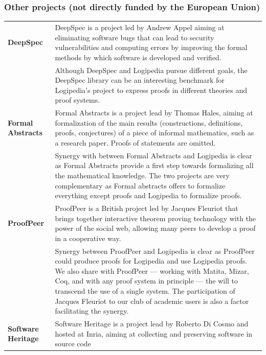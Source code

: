 \subsubsection*{Other projects (not directly funded by the European Union)}

\begin{longtable}{|p{}|p{}|}
\hline
{\bf DeepSpec}
&
DeepSpec is a project led by Andrew Appel aiming at eliminating
software bugs that can lead to security vulnerabilities and computing
errors by improving the formal methods by which software is developed
and verified.
\\
&
\hspace{0.4cm}
Although DeepSpec and Logipedia pursue different goals, the DeepSpec
library can be an interesting benchmark for Logipedia's project to
express proofs in different theories and proof systems.
\\
\hline
{\bf Formal Abstracts} & 
Formal Abstracts is a project lead by Thomas Hales, aiming at
formalization of the main results (constructions, definitions, proofs,
conjectures) of a piece of informal mathematics, such as a research
paper.  Proofs of statements are omitted.
\\
&
\hspace{0.4cm} Synergy with between Formal Abstracts and Logipedia is
clear as Formal Abstracts provide a first step towards formalizing all
the mathematical knowledge. The two projects are very complementary as 
Formal abstracts offers to formalize everything except proofs and
Logipedia to formalize proofs.
\\
\hline
{\bf ProofPeer}
&
ProofPeer is a British project led by Jacques Fleuriot that 
brings together interactive theorem proving technology with
the power of the social web, allowing many peers to develop a proof 
in a cooperative way.\\
&
\hspace{0.4cm}
Synergy between ProofPeer and Logipedia is clear as ProofPeer
could produce proofs for Logipedia and use Logipedia proofs.  We also
share with ProofPeer --- working with Matita, Mizar, Coq, and with any
proof system in principle --- the will to transcend the use of a single
system. The participation of Jacques Fleuriot to our club of academic users 
is also a factor facilitating the synergy.\\
\hline
{\bf Software Heritage} & 
Software Heritage is a project lead by Roberto Di Cosmo and hosted at
Inria, aiming at collecting and preserving software in source code

\end{longtable}
